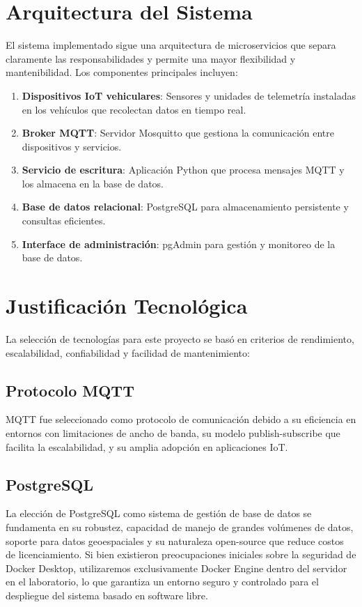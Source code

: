 \section{Arquitectura del Sistema}

El sistema implementado sigue una arquitectura de microservicios que separa claramente las responsabilidades y permite una mayor flexibilidad y mantenibilidad. Los componentes principales incluyen:

\begin{enumerate}[noitemsep]
    \item \textbf{Dispositivos IoT vehiculares}: Sensores y unidades de telemetría instaladas en los vehículos que recolectan datos en tiempo real.
    \item \textbf{Broker MQTT}: Servidor Mosquitto que gestiona la comunicación entre dispositivos y servicios.
    \item \textbf{Servicio de escritura}: Aplicación Python que procesa mensajes MQTT y los almacena en la base de datos.
    \item \textbf{Base de datos relacional}: PostgreSQL para almacenamiento persistente y consultas eficientes.
    \item \textbf{Interface de administración}: pgAdmin para gestión y monitoreo de la base de datos.
\end{enumerate}

\section{Justificación Tecnológica}

La selección de tecnologías para este proyecto se basó en criterios de rendimiento, escalabilidad, confiabilidad y facilidad de mantenimiento:

\subsection{Protocolo MQTT}
MQTT fue seleccionado como protocolo de comunicación debido a su eficiencia en entornos con limitaciones de ancho de banda, su modelo publish-subscribe que facilita la escalabilidad, y su amplia adopción en aplicaciones IoT.

\subsection{PostgreSQL}
La elección de PostgreSQL como sistema de gestión de base de datos se fundamenta en su robustez, capacidad de manejo de grandes volúmenes de datos, soporte para datos geoespaciales y su naturaleza open-source que reduce costos de licenciamiento.
Si bien existieron preocupaciones iniciales sobre la seguridad de Docker Desktop, utilizaremos exclusivamente Docker Engine dentro del servidor en el laboratorio, lo que garantiza un entorno seguro y controlado para el despliegue del sistema
basado en software libre.

